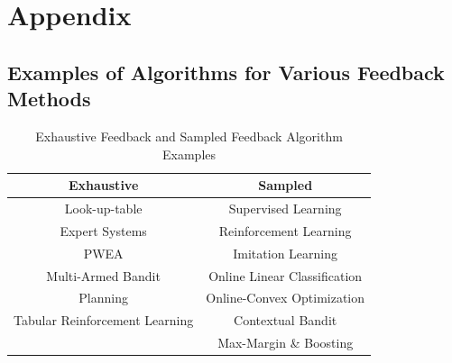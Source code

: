 \documentclass[11pt]{article}
\begin{document}
{


}

\section{Appendix}


\subsection{Examples of Algorithms for Various Feedback Methods}

\begin{center}
\begin{table} [H]
\begin{center}
\begin{tabular}{||c | c||} 
 \hline
 Exhaustive & Sampled  \\ [0.5ex] 
 \hline\hline
 Look-up-table & Supervised Learning \\ 
 \hline
 Expert Systems & Reinforcement Learning \\
 \hline
 PWEA & Imitation Learning \\
 \hline
 Multi-Armed Bandit & Online Linear Classification \\
 \hline
 Planning & Online-Convex Optimization \\
 \hline
 Tabular Reinforcement Learning & Contextual Bandit \\
 \hline
  & Max-Margin \& Boosting \\ [1ex] 
 \hline
\end{tabular}
\caption{\label{tab:exh_samp_ex}Exhaustive Feedback and Sampled Feedback Algorithm Examples}
\end{center}
\end{table}
\end{center}
\end{document}
